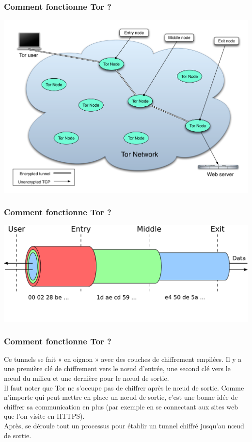 \begin{frame}
\frametitle{Comment fonctionne Tor ?}
\begin{center}
\includegraphics[keepaspectratio,width=\textwidth, height=.8\textheight]{./materials/tor-safe-path}
\end{center}
\end{frame}

\begin{frame}
\frametitle{Comment fonctionne Tor ?}
\begin{center}
\includegraphics[keepaspectratio,width=\textwidth, height=.8\textheight]{./materials/tor-keys1}
\end{center}
\end{frame}

\begin{frame}
\frametitle{Comment fonctionne Tor ?}

Ce tunnels se fait « en oignon » avec des couches de chiffrement empilées. Il y a une première
clé de chiffrement vers le nœud d'entrée, une second clé vers le nœud du milieu et
une dernière pour le nœud de sortie.
\\
Il faut noter que Tor ne s'occupe pas de chiffrer après le nœud de sortie. Comme n'importe
qui peut mettre en place un nœud de sortie, c'est une bonne idée de chiffrer sa communication
en plus (par exemple en se connectant aux sites web que l'on visite en HTTPS).
\\
Après, se déroule tout un processus pour établir un tunnel chiffré jusqu'au
nœud de sortie.
\end{frame}


